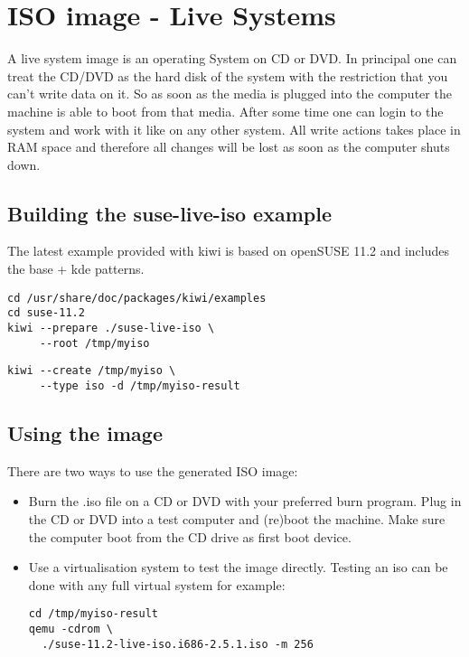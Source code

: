 \chapter{ISO image - Live Systems}
\label{chapter:iso}
\minitoc

A live system image is an operating System on CD or DVD. In principal
one can treat the CD/DVD as the hard disk of the system with the
restriction that you can't write data on it. So as soon as the media
is plugged into the computer the machine is able to boot from that
media. After some time one can login to the system and work with it
like on any other system. All write actions takes place in RAM space
and therefore all changes will be lost as soon as the computer shuts
down.

\section{Building the suse-live-iso example}

The latest example provided with kiwi is based on openSUSE 11.2 and
includes the base + kde patterns.

\begin{Command}{12cm}
\begin{verbatim}
cd /usr/share/doc/packages/kiwi/examples
cd suse-11.2
kiwi --prepare ./suse-live-iso \
     --root /tmp/myiso
\end{verbatim}
\end{Command}

\begin{Command}{12cm}
\begin{verbatim}
kiwi --create /tmp/myiso \
     --type iso -d /tmp/myiso-result
\end{verbatim}
\end{Command}

\section{Using the image}

There are two ways to use the generated ISO image:
\begin{itemize}
\item Burn the .iso file on a CD or DVD with your preferred burn program.
      Plug in the CD or DVD into a test computer and (re)boot the machine.
      Make sure the computer boot from the CD drive as first boot device.
\item Use a virtualisation system to test the image directly. Testing an
      iso can be done with any full virtual system for example:

      \begin{Command}{12cm}
      \begin{verbatim}
cd /tmp/myiso-result
qemu -cdrom \
  ./suse-11.2-live-iso.i686-2.5.1.iso -m 256
      \end{verbatim}
      \end{Command}
\end{itemize}

